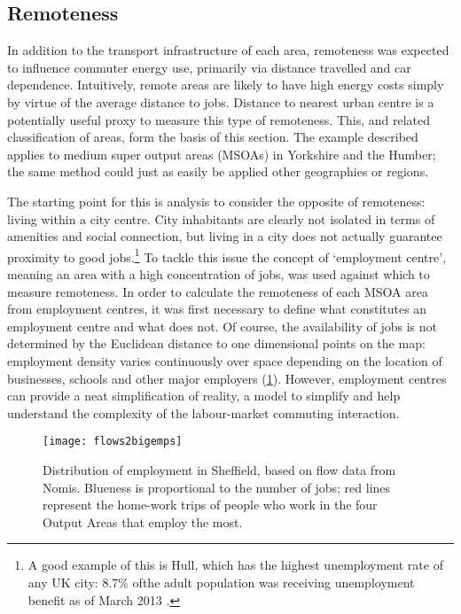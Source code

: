\subsection{Remoteness}  \label{sremotness}
In addition to the transport infrastructure of each area, remoteness was
expected to influence
commuter energy use, primarily via distance travelled and car dependence.
Intuitively, remote areas are likely to have high energy costs simply by virtue
of the average distance to jobs. Distance to nearest urban centre is a
potentially useful proxy to measure this type of remoteness. This, and
related classification of areas, form the basis of this section.  
The example described applies to medium super output areas (MSOAs) in Yorkshire
and the Humber; the same method could just as easily be applied other
geographies or regions.

The starting point for this is analysis to consider the opposite of remoteness:
living within a city centre. City inhabitants are clearly not isolated in terms
of amenities and social connection, but living in a city does not
actually guarantee proximity to good jobs.\footnote{A good
example of this is Hull, which has the highest unemployment rate of any UK city:
8.7\% ofthe adult population was receiving unemployment benefit as of March 2013
\citep{SimonRog}.
}
To tackle this issue the concept of `employment centre', meaning an area 
with a high concentration of jobs,  was used
against which to measure remoteness. In order to calculate the remoteness of
each MSOA area from employment centres,
it was first necessary to define what constitutes an employment centre and what
does not. Of course, the availability of jobs is not determined by the
Euclidean distance to one dimensional points on the map: employment density
varies continuously over space depending on the location of businesses, schools
and other major employers (\cref{flows2bigemps}). However, employment centres
can provide a neat simplification of reality, a model to simplify and help
understand the complexity of the labour-market commuting interaction.

\begin{figure}[h]
 \begin{center}
 \texttt{[image: flows2bigemps]}\end{center}
 \caption[Distribution of employment in Sheffield]{Distribution of employment
in Sheffield, based on flow data from Nomis.
Blueness is
proportional to the number of jobs; red lines represent the home-work trips of
people who work in the four Output Areas that employ the most.}
 \label{flows2bigemps}
\end{figure}

